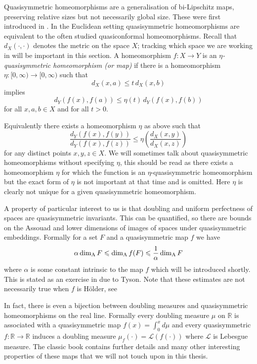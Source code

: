 Quasisymmetric homeomorphisms are a generalisation of bi-Lipschitz maps, preserving relative sizes but not necessarily global size. These were first introduced in \cite{ahlfors-beurling, tukia-vaisala}. In the Euclidean setting quasisymmetric homeomorphisms are equivalent to the often studied quasiconformal homeomorphisms. Recall that $d_X(\cdot,\cdot)$ denotes the metric on the space $X$; tracking which space we are working in will be important in this section. A homeomorphism $f\colon X \rightarrow Y$ is an \textit{$\eta$-quasisymmetric homeomorphism (or map)} if there is a homeomorphism $\eta \colon [0,\infty) \rightarrow [0,\infty)$ such that 
\[
d_X( x , a ) \le t \, d_X( x , b )
\]
implies 
\[
d_Y( f(x) , f(a) ) \le \eta(t) \, d_Y ( f(x) , f(b) )
\]
for all $x,a,b \in X$ and for all $t>0$.

Equivalently there exists a homeomorphism $\eta$ as above such that 
\[
\frac{d_Y(f(x),f(y))}{d_Y(f(x),f(z))} \le \eta \left(\frac{d_X(x,y)}{d_X(x,z)} \right)
\]
for any distinct points $x,y,z \in X$. We will sometimes talk about quasisymmetric homeomorphisms without specifying $\eta$, this should be read as there exists a homeomorphism $\eta$ for which the function is an $\eta$-quasisymmetric homeomorphism but the exact form of $\eta$ is not important at that time and is omitted. Here $\eta$ is clearly not unique for a given quasisymmetric homeomorphism. 


A property of particular interest to us is that doubling and uniform perfectness of spaces are quasisymmetric invariants. This can be quantified, so there are bounds on the Assouad and lower dimensions of images of spaces under quasisymmetric embeddings. Formally for a set $F$ and a quasisymmetric map $f$ we have
\[
\alpha \dim_{\textup{A}} F \leqslant \dim_{\textup{A}} f(F) \leqslant \frac{1}{\alpha} \dim_{\textup{A}} F
\]
where $\alpha$ is some constant intrinsic to the map $f$ which will be introduced shortly. This is stated as an exercise in \cite{heinonen} due to Tyson. Note that these estimates are not necessarily true when $f$ is H\"older, see \cite{luk}

In fact, there is even a bijection between doubling measures and quasisymmetric homeomorphisms on the real line. Formally every doubling measure $\mu$ on $\mathbb{R}$ is associated with a quasisymmetric map $f(x) = \int_{0}^{x}d\mu$ and every quasisymmetric $f \colon \mathbb{R} \rightarrow \mathbb{R}$ induces a doubling measure $\mu_f( \cdot ) = \mathcal{L}(f(\cdot)) $ where $\mathcal{L}$ is Lebesgue measure. The classic book \cite{heinonen} contains further details and many other interesting properties of these maps that we will not touch upon in this thesis.

